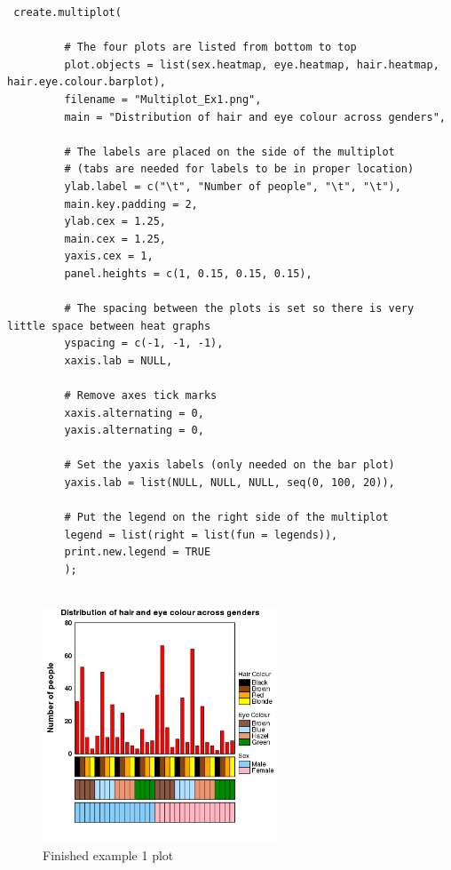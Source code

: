 \documentclass[letterpaper]{article}
\begin{document}
\begin{verbatim}
 create.multiplot(
    
         # The four plots are listed from bottom to top 
         plot.objects = list(sex.heatmap, eye.heatmap, hair.heatmap, hair.eye.colour.barplot),
         filename = "Multiplot_Ex1.png",
         main = "Distribution of hair and eye colour across genders",

         # The labels are placed on the side of the multiplot 
         # (tabs are needed for labels to be in proper location)
         ylab.label = c("\t", "Number of people", "\t", "\t"),
         main.key.padding = 2,
         ylab.cex = 1.25,
         main.cex = 1.25,
         yaxis.cex = 1,
         panel.heights = c(1, 0.15, 0.15, 0.15),

         # The spacing between the plots is set so there is very little space between heat graphs
         yspacing = c(-1, -1, -1),
         xaxis.lab = NULL,

         # Remove axes tick marks
         xaxis.alternating = 0,
         yaxis.alternating = 0,

         # Set the yaxis labels (only needed on the bar plot)
         yaxis.lab = list(NULL, NULL, NULL, seq(0, 100, 20)),

         # Put the legend on the right side of the multiplot
         legend = list(right = list(fun = legends)),
         print.new.legend = TRUE
         );
         
\end{verbatim}
\begin{figure}[!ht]
  \begin{center}
     \includegraphics[width=70mm]{Figures/Multiplot_Ex1.png}
     \caption{Finished example 1 plot}
     \label{fig:picture}
  \end{center}
\end{figure}
\end{document}
